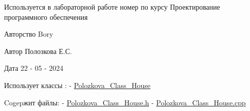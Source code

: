 Используется в лабораторной работе номер по курсу Проектирование программного обеспечения \begin{DoxyCopyright}{Авторство}
Bory 
\end{DoxyCopyright}
\begin{DoxyAuthor}{Автор}
Полозкова Е.\+С. 
\end{DoxyAuthor}
\begin{DoxyDate}{Дата}
22 -\/ 05 -\/ 2024 
\end{DoxyDate}
\begin{DoxyParagraph}{Использует классы \+:}
﻿﻿-\/ \hyperlink{class_polozkova___class___house}{Polozkova\+\_\+\+Class\+\_\+\+House} 
\end{DoxyParagraph}
\begin{DoxyParagraph}{Cogepжит файлы\+:}
﻿﻿-\/ \hyperlink{_polozkova___class___house_8h}{Polozkova\+\_\+\+Class\+\_\+\+House.\+h} ﻿﻿-\/ \hyperlink{_polozkova___class___house_8cpp}{Polozkova\+\_\+\+Class\+\_\+\+House.\+cpp} 
\end{DoxyParagraph}
